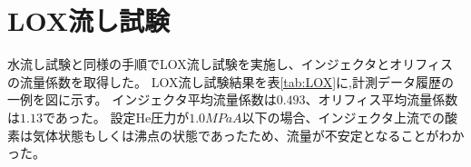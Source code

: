 \section{LOX流し試験}
水流し試験と同様の手順でLOX流し試験を実施し、インジェクタとオリフィスの流量係数を取得した。
LOX流し試験結果を表\ref{tab:LOX}に,計測データ履歴の一例を図に示す。
インジェクタ平均流量係数は$0.493$、オリフィス平均流量係数は$1.13$であった。
設定He圧力が$1.0MPaA$以下の場合、インジェクタ上流での酸素は気体状態もしくは沸点の状態であったため、流量が不安定となることがわかった。


